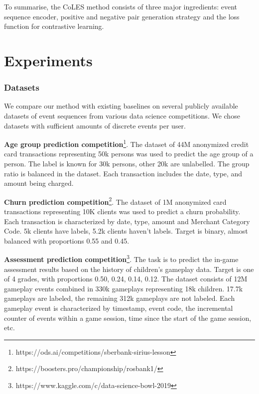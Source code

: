 \documentclass[sigconf]{acmart}
\begin{document}
To summarise, the CoLES method consists of three major ingredients: event sequence encoder, positive and negative pair generation strategy and the loss function for contrastive learning.


\section{Experiments} \label{sec-exp}

\subsubsection{Datasets}

We compare our method with existing baselines on several publicly available datasets of event sequences from various data science competitions. We chose datasets with sufficient amounts of discrete events per user.

\textbf{Age group prediction competition}\footnote{https://ods.ai/competitions/sberbank-sirius-lesson}. The dataset of 44M an\-onymized credit card transactions representing 50k persons was used to predict the age group of a person. The label is known for 30k persons, other 20k are unlabelled. The group ratio is balanced in the dataset. Each transaction includes the date, type, and amount being charged.


\textbf{Churn prediction competition}\footnote{https://boosters.pro/championship/rosbank1/}. The dataset of 1M an\-onymiz\-ed card transactions representing 10K clients was used to predict a churn probability. Each transaction is characterized by date, type, amount and Merchant Category Code. 5k clients have labels, 5.2k clients haven't labels. Target is binary, almost balanced with proportions 0.55 and 0.45.

\textbf{Assessment prediction competition}\footnote{https://www.kaggle.com/c/data-science-bowl-2019}.  The task is to predict the in-game assessment results based on the history of children's gameplay data. Target is one of 4 grades, with proportions 0.50, 0.24, 0.14, 0.12. The dataset consists of 12M gameplay events combined in 330k gameplays representing 18k children. 17.7k gameplays are labeled, the remaining 312k gameplays are not labeled. Each gameplay event is characterized by timestamp, event code, the incremental counter of events within a game session, time since the start of the game session, etc.
\end{document}
